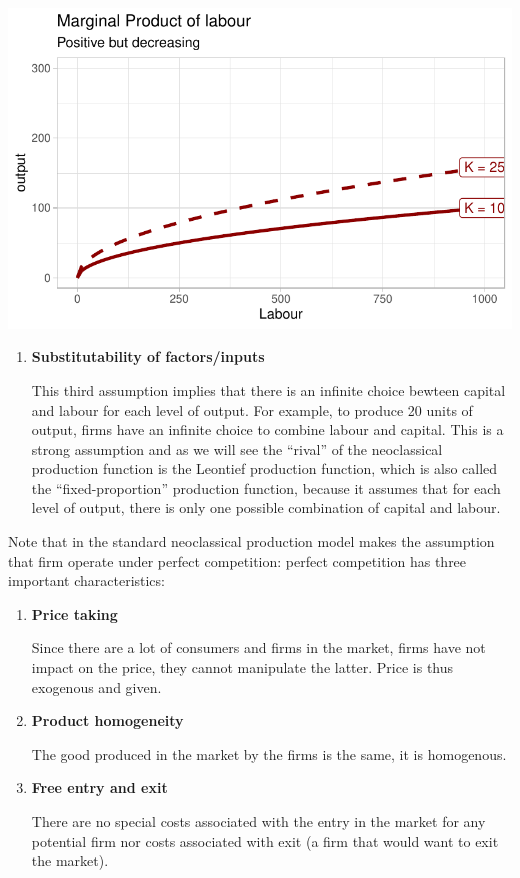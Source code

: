 \documentclass[
  letterpaper,
  DIV=11,
  numbers=noendperiod]{scrreprt}
\begin{document}
\includegraphics{production-theory_files/figure-pdf/unnamed-chunk-6-1.pdf}

\begin{enumerate}
\def\labelenumi{\arabic{enumi}.}
\setcounter{enumi}{2}
\item
  \textbf{Substitutability of factors/inputs}

  This third assumption implies that there is an infinite choice bewteen
  capital and labour for each level of output. For example, to produce
  20 units of output, firms have an infinite choice to combine labour
  and capital. This is a strong assumption and as we will see the
  ``rival'' of the neoclassical production function is the Leontief
  production function, which is also called the ``fixed-proportion''
  production function, because it assumes that for each level of output,
  there is only one possible combination of capital and labour.
\end{enumerate}

Note that in the standard neoclassical production model makes the
assumption that firm operate under perfect competition: perfect
competition has three important characteristics:

\begin{enumerate}
\def\labelenumi{\arabic{enumi}.}
\item
  \textbf{Price taking}

  Since there are a lot of consumers and firms in the market, firms have
  not impact on the price, they cannot manipulate the latter. Price is
  thus exogenous and given.
\item
  \textbf{Product homogeneity}

  The good produced in the market by the firms is the same, it is
  homogenous.
\item
  \textbf{Free entry and exit}

  There are no special costs associated with the entry in the market for
  any potential firm nor costs associated with exit (a firm that would
  want to exit the market).
\end{enumerate}
\end{document}
